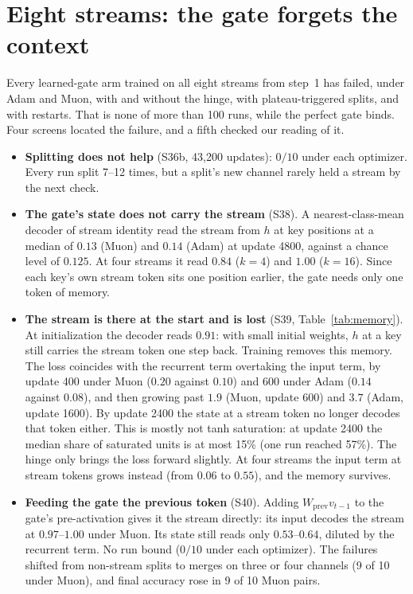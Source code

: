 \documentclass[11pt]{article}
\begin{document}
\section{Eight streams: the gate forgets the context}
\label{sec:eight}

Every learned-gate arm trained on all eight streams from step~1 has failed, under Adam and Muon, with and without the hinge, with plateau-triggered splits, and with restarts. That is none of more than 100 runs, while the perfect gate binds. Four screens located the failure, and a fifth checked our reading of it.

\begin{itemize}
\item \textbf{Splitting does not help} (S36b, 43{,}200 updates): $0/10$ under each optimizer. Every run split 7--12 times, but a split's new channel rarely held a stream by the next check.
\item \textbf{The gate's state does not carry the stream} (S38). A nearest-class-mean decoder of stream identity read the stream from $h$ at key positions at a median of $0.13$ (Muon) and $0.14$ (Adam) at update 4800, against a chance level of $0.125$. At four streams it read $0.84$ ($k = 4$) and $1.00$ ($k = 16$). Since each key's own stream token sits one position earlier, the gate needs only one token of memory.
\item \textbf{The stream is there at the start and is lost} (S39, Table~\ref{tab:memory}). At initialization the decoder reads $0.91$: with small initial weights, $h$ at a key still carries the stream token one step back. Training removes this memory. The loss coincides with the recurrent term overtaking the input term, by update 400 under Muon ($0.20$ against $0.10$) and 600 under Adam ($0.14$ against $0.08$), and then growing past $1.9$ (Muon, update 600) and $3.7$ (Adam, update 1600). By update 2400 the state at a stream token no longer decodes that token either. This is mostly not tanh saturation: at update 2400 the median share of saturated units is at most 15\% (one run reached 57\%). The hinge only brings the loss forward slightly. At four streams the input term at stream tokens grows instead (from $0.06$ to $0.55$), and the memory survives.
\item \textbf{Feeding the gate the previous token} (S40). Adding $W_{\mathrm{prev}} v_{t-1}$ to the gate's pre-activation gives it the stream directly: its input decodes the stream at $0.97$--$1.00$ under Muon. Its state still reads only $0.53$--$0.64$, diluted by the recurrent term. No run bound ($0/10$ under each optimizer). The failures shifted from non-stream splits to merges on three or four channels (9 of 10 under Muon), and final accuracy rose in 9 of 10 Muon pairs.
\end{itemize}
\end{document}
